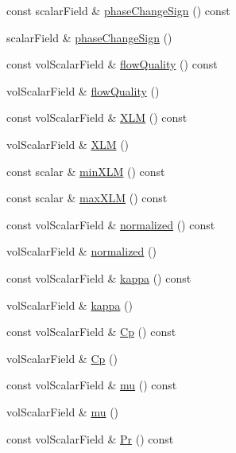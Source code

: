 \begin{DoxyCompactItemize}
\item 
const scalar\+Field \& \hyperlink{classFoam_1_1fluid_acfbd44525404ff7c6c10c1f48107e218}{phase\+Change\+Sign} () const
\item 
scalar\+Field \& \hyperlink{classFoam_1_1fluid_a8b1b897b11983b5506f2c0785ae070c7}{phase\+Change\+Sign} ()
\item 
const vol\+Scalar\+Field \& \hyperlink{classFoam_1_1fluid_af0f64956745ae43e76b72159b00e3072}{flow\+Quality} () const
\item 
vol\+Scalar\+Field \& \hyperlink{classFoam_1_1fluid_a3f7eb220bdef287f413bda3214570fa6}{flow\+Quality} ()
\item 
const vol\+Scalar\+Field \& \hyperlink{classFoam_1_1fluid_a88c32fe097e18bab02f7efc093e98ece}{X\+LM} () const
\item 
vol\+Scalar\+Field \& \hyperlink{classFoam_1_1fluid_a52ccb918a44f4f0cad7e95ca5dff7b14}{X\+LM} ()
\item 
const scalar \& \hyperlink{classFoam_1_1fluid_a24ac4971d33010828584472dcfae5907}{min\+X\+LM} () const
\item 
const scalar \& \hyperlink{classFoam_1_1fluid_ab2ee7e33bb09dd3385bea0ac648622da}{max\+X\+LM} () const
\item 
const vol\+Scalar\+Field \& \hyperlink{classFoam_1_1fluid_acd6d0e52337be3f13bfd9fabf7061ec0}{normalized} () const
\item 
vol\+Scalar\+Field \& \hyperlink{classFoam_1_1fluid_a7726af3fb6482cac4178c4546617c94a}{normalized} ()
\item 
const vol\+Scalar\+Field \& \hyperlink{classFoam_1_1fluid_a9558b66566a0057d6b458ba953f0d291}{kappa} () const
\item 
vol\+Scalar\+Field \& \hyperlink{classFoam_1_1fluid_a09ccc2ba084b5c803005abe3d99717f3}{kappa} ()
\item 
const vol\+Scalar\+Field \& \hyperlink{classFoam_1_1fluid_a8b8817caced37fe24d98676072299b12}{Cp} () const
\item 
vol\+Scalar\+Field \& \hyperlink{classFoam_1_1fluid_a436a2a332c59d5391d8f709adf4921c8}{Cp} ()
\item 
const vol\+Scalar\+Field \& \hyperlink{classFoam_1_1fluid_a54025d7e9635694b562bfb981e31e6da}{mu} () const
\item 
vol\+Scalar\+Field \& \hyperlink{classFoam_1_1fluid_a333767c92c708885e34da9a87d27fd02}{mu} ()
\item 
const vol\+Scalar\+Field \& \hyperlink{classFoam_1_1fluid_a3e5aa5babcbf9c4727d33645b157771e}{Pr} () const
\item 

\end{DoxyCompactItemize}
